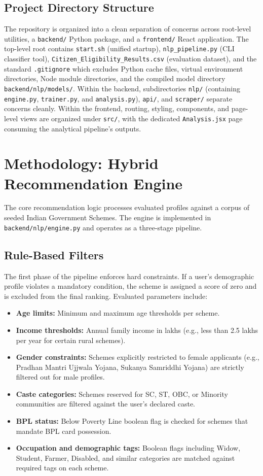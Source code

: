 \documentclass[10pt, journal, twocolumn]{IEEEtran}
\begin{document}
\subsection{Project Directory Structure}
The repository is organized into a clean separation of concerns across root-level utilities, a \texttt{backend/} Python package, and a \texttt{frontend/} React application. The top-level root contains \texttt{start.sh} (unified startup), \texttt{nlp\_pipeline.py} (CLI classifier tool), \texttt{Citizen\_Eligibility\_Results.csv} (evaluation dataset), and the standard \texttt{.gitignore} which excludes Python cache files, virtual environment directories, Node module directories, and the compiled model directory \texttt{backend/nlp/models/}. Within the backend, subdirectories \texttt{nlp/} (containing \texttt{engine.py}, \texttt{trainer.py}, and \texttt{analysis.py}), \texttt{api/}, and \texttt{scraper/} separate concerns cleanly. Within the frontend, routing, styling, components, and page-level views are organized under \texttt{src/}, with the dedicated \texttt{Analysis.jsx} page consuming the analytical pipeline's outputs.

\section{Methodology: Hybrid Recommendation Engine}
The core recommendation logic processes evaluated profiles against a corpus of seeded Indian Government Schemes. The engine is implemented in \texttt{backend/nlp/engine.py} and operates as a three-stage pipeline.

\subsection{Rule-Based Filters}
The first phase of the pipeline enforces hard constraints. If a user's demographic profile violates a mandatory condition, the scheme is assigned a score of zero and is excluded from the final ranking. Evaluated parameters include:
\begin{itemize}
    \item \textbf{Age limits:} Minimum and maximum age thresholds per scheme.
    \item \textbf{Income thresholds:} Annual family income in lakhs (e.g., less than 2.5 lakhs per year for certain rural schemes).
    \item \textbf{Gender constraints:} Schemes explicitly restricted to female applicants (e.g., Pradhan Mantri Ujjwala Yojana, Sukanya Samriddhi Yojana) are strictly filtered out for male profiles.
    \item \textbf{Caste categories:} Schemes reserved for SC, ST, OBC, or Minority communities are filtered against the user's declared caste.
    \item \textbf{BPL status:} Below Poverty Line boolean flag is checked for schemes that mandate BPL card possession.
    \item \textbf{Occupation and demographic tags:} Boolean flags including Widow, Student, Farmer, Disabled, and similar categories are matched against required tags on each scheme.
\end{itemize}
\end{document}
